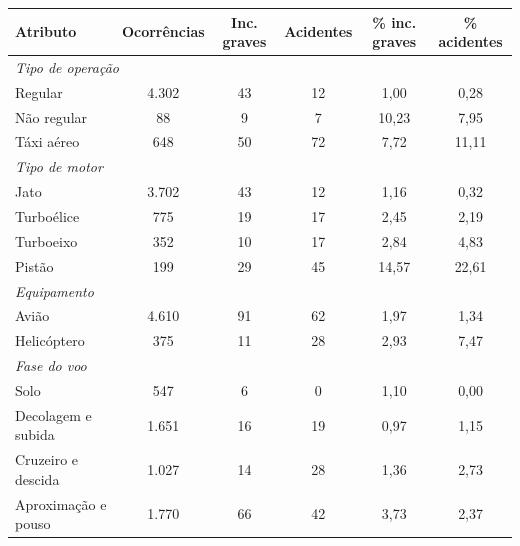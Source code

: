 \begin{tabular}{lccccc}
\toprule
\textbf{Atributo} & \textbf{Ocorrências} & \textbf{Inc. graves} & \textbf{Acidentes} & \textbf{\% inc. graves} & \textbf{\% acidentes} \\
\midrule
\multicolumn{6}{l}{\textit{Tipo de operação}} \\
\hspace{1em}Regular & 4.302 & 43 & 12 & 1,00 & 0,28 \\
\hspace{1em}Não regular & 88 & 9 & 7 & 10,23 & 7,95 \\
\hspace{1em}Táxi aéreo & 648 & 50 & 72 & 7,72 & 11,11 \\
\multicolumn{6}{l}{\textit{Tipo de motor}} \\
\hspace{1em}Jato & 3.702 & 43 & 12 & 1,16 & 0,32 \\
\hspace{1em}Turboélice & 775 & 19 & 17 & 2,45 & 2,19 \\
\hspace{1em}Turboeixo & 352 & 10 & 17 & 2,84 & 4,83 \\
\hspace{1em}Pistão & 199 & 29 & 45 & 14,57 & 22,61 \\
\multicolumn{6}{l}{\textit{Equipamento}} \\
\hspace{1em}Avião & 4.610 & 91 & 62 & 1,97 & 1,34 \\
\hspace{1em}Helicóptero & 375 & 11 & 28 & 2,93 & 7,47 \\
\multicolumn{6}{l}{\textit{Fase do voo}} \\
\hspace{1em}Solo & 547 & 6 & 0 & 1,10 & 0,00 \\
\hspace{1em}Decolagem e subida & 1.651 & 16 & 19 & 0,97 & 1,15 \\
\hspace{1em}Cruzeiro e descida & 1.027 & 14 & 28 & 1,36 & 2,73 \\
\hspace{1em}Aproximação e pouso & 1.770 & 66 & 42 & 3,73 & 2,37 \\
\bottomrule
\end{tabular}
